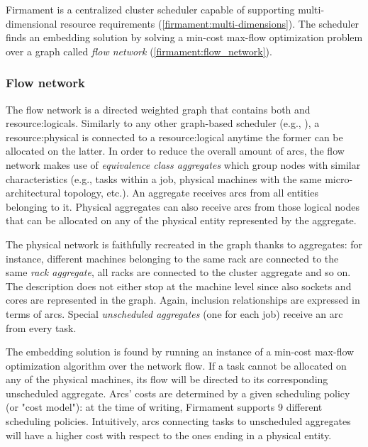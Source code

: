 Firmament \cite{firmament} is a centralized cluster scheduler capable of supporting multi-dimensional resource requirements (\autoref{firmament:multi-dimensions}).
The scheduler finds an embedding solution by solving a min-cost max-flow optimization problem over a graph called \textit{flow network} (\autoref{firmament:flow_network}).

\subsubsection{Flow network} \label{firmament:flow_network}
The flow network is a directed weighted graph that contains both  and \glspl{resource:logical}.
Similarly to any other graph-based scheduler (e.g., \cite{ontackling}), a \gls{resource:physical} is connected to a \gls{resource:logical} anytime the former can be allocated on the latter.
In order to reduce the overall amount of arcs, the flow network makes use of \textit{equivalence class aggregates} which group nodes with similar characteristics (e.g., tasks within a job, physical machines with the same micro-architectural topology, etc.).
An aggregate receives arcs from all entities belonging to it.
Physical aggregates can also receive arcs from those logical nodes that can be allocated on any of the physical entity represented by the aggregate.\par
The physical network is faithfully recreated in the graph thanks to aggregates: for instance, different machines belonging to the same rack are connected to the same \textit{rack aggregate}, all racks are connected to the cluster aggregate and so on.
The description does not either stop at the machine level since also sockets and cores are represented in the graph.
Again, inclusion relationships are expressed in terms of arcs.
Special \textit{unscheduled aggregates} (one for each job) receive an arc from every task.\par
The embedding solution is found by running an instance of a min-cost max-flow optimization algorithm over the network flow.
If a task cannot be allocated on any of the physical machines, its flow will be directed to its corresponding unscheduled aggregate.
Arcs' costs are determined by a given scheduling policy (or "cost model"): at the time of writing, Firmament \cite{firmament} supports 9 different scheduling policies.
Intuitively, arcs connecting tasks to unscheduled aggregates will have a higher cost with respect to the ones ending in a physical entity.

